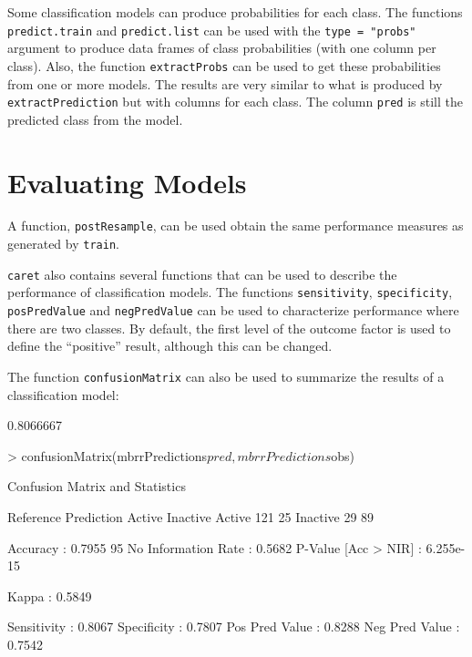 \documentclass[12pt]{article}
\begin{document}
Some classification models can produce probabilities for each class. The functions \texttt{predict.train} and \texttt{predict.list} can be used with the \texttt{type = "probs"} argument to produce data frames of class probabilities (with one column per class). Also, the function \texttt{extractProbs} can be used to get these probabilities from one or more models. The results are very similar to what is produced by \texttt{extractPrediction} but with columns for each class. The column \texttt{pred} is still the predicted class from the model. 


\section{Evaluating Models}

A function, \texttt{postResample}, can be used obtain the same performance measures as generated by \texttt{train}. 

\texttt{caret} also contains several functions that can be used to describe the performance of classification models. The functions \texttt{sensitivity}, \texttt{specificity}, \texttt{posPredValue} and \texttt{negPredValue} can be used to characterize performance where there are two classes. By default, the first level of the outcome factor is used to define the ``positive'' result, although this can be changed. 

The function \texttt{confusionMatrix} can also be used to summarize the results of a classification model:

\begin{small}
\begin{Schunk}
\begin{Soutput}
[1] 0.8066667
\end{Soutput}
\begin{Sinput}
> confusionMatrix(mbrrPredictions$pred, mbrrPredictions$obs)
\end{Sinput}
\begin{Soutput}
Confusion Matrix and Statistics

          Reference
Prediction Active Inactive
  Active      121       25
  Inactive     29       89
                                       
            Accuracy : 0.7955          
              95% CI : (0.7417, 0.8424)
 No Information Rate : 0.5682          
 P-Value [Acc > NIR] : 6.255e-15       
                                       
               Kappa : 0.5849          
                                       
         Sensitivity : 0.8067          
         Specificity : 0.7807          
      Pos Pred Value : 0.8288          
      Neg Pred Value : 0.7542          
\end{Soutput}
\end{Schunk}
\end{small}
\end{document}
